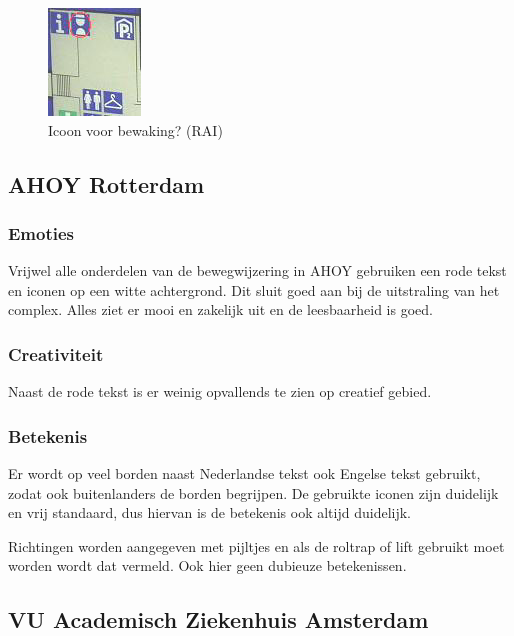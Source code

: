 \begin{figure}
\begin{center}
\includegraphics{images/rai_controle.jpg}
\end{center}
\caption{Icoon voor bewaking? (RAI)}
\label{figuur:rai_controle}
\end{figure}


\subsection{AHOY Rotterdam}


\subsubsection{Emoties}

Vrijwel alle onderdelen van de bewegwijzering in AHOY gebruiken een rode tekst en iconen op een witte achtergrond. Dit sluit goed aan bij de uitstraling van het complex. Alles ziet er mooi en zakelijk uit en de leesbaarheid is goed.


\subsubsection{Creativiteit}

Naast de rode tekst is er weinig opvallends te zien op creatief gebied.


\subsubsection{Betekenis}

Er wordt op veel borden naast Nederlandse tekst ook Engelse tekst gebruikt, zodat ook buitenlanders de borden begrijpen. De gebruikte iconen zijn duidelijk en vrij standaard, dus hiervan is de betekenis ook altijd duidelijk.

Richtingen worden aangegeven met pijltjes en als de roltrap of lift gebruikt moet worden wordt dat vermeld. Ook hier geen dubieuze betekenissen.


\subsection{VU Academisch Ziekenhuis Amsterdam}


